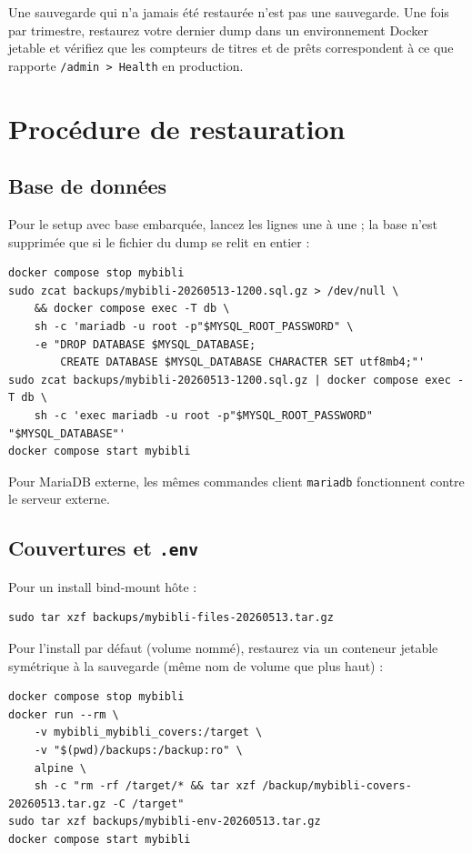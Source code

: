 \begin{tip}
Une sauvegarde qui n'a jamais été restaurée n'est pas une
sauvegarde. Une fois par trimestre, restaurez votre dernier dump
dans un environnement Docker jetable et vérifiez que les compteurs
de titres et de prêts correspondent à ce que rapporte
\texttt{/admin > Health} en production.
\end{tip}

\section{Procédure de restauration}

\subsection*{Base de données}

Pour le setup avec base embarquée, lancez les lignes une à une ; la
base n'est supprimée que si le fichier du dump se relit en entier :

\begin{lstlisting}
docker compose stop mybibli
sudo zcat backups/mybibli-20260513-1200.sql.gz > /dev/null \
    && docker compose exec -T db \
    sh -c 'mariadb -u root -p"$MYSQL_ROOT_PASSWORD" \
    -e "DROP DATABASE $MYSQL_DATABASE;
        CREATE DATABASE $MYSQL_DATABASE CHARACTER SET utf8mb4;"'
sudo zcat backups/mybibli-20260513-1200.sql.gz | docker compose exec -T db \
    sh -c 'exec mariadb -u root -p"$MYSQL_ROOT_PASSWORD" "$MYSQL_DATABASE"'
docker compose start mybibli
\end{lstlisting}

Pour MariaDB externe, les mêmes commandes client \texttt{mariadb}
fonctionnent contre le serveur externe.

\subsection*{Couvertures et \texttt{.env}}

Pour un install bind-mount hôte :

\begin{lstlisting}
sudo tar xzf backups/mybibli-files-20260513.tar.gz
\end{lstlisting}

Pour l'install par défaut (volume nommé), restaurez via un
conteneur jetable symétrique à la sauvegarde (même nom de volume que
plus haut) :

\begin{lstlisting}
docker compose stop mybibli
docker run --rm \
    -v mybibli_mybibli_covers:/target \
    -v "$(pwd)/backups:/backup:ro" \
    alpine \
    sh -c "rm -rf /target/* && tar xzf /backup/mybibli-covers-20260513.tar.gz -C /target"
sudo tar xzf backups/mybibli-env-20260513.tar.gz
docker compose start mybibli
\end{lstlisting}

